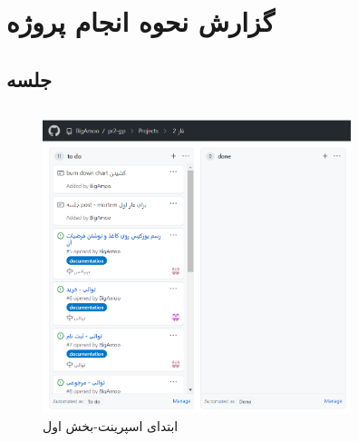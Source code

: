 \documentclass[12pt,a4paper]{article}
\begin{document}
\pagebreak

\section{گزارش نحوه انجام پروژه} \label{section.report}

\subsection{جلسه } \label{section.report.postMortem}

\pagebreak

\subsection{} \label{section.report.taskBoard}
		\begin{figure}[h!]
		\begin{center}
			\includegraphics[width=9cm]{images/screenshot_1.png}	
		\end{center}
		\caption{ابتدای اسپرینت-بخش اول}
	\end{figure}
	
\end{document}
